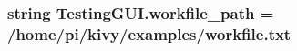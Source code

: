 \subsubsection[{\texorpdfstring{workfile\+\_\+path}{workfile_path}}]{\setlength{\rightskip}{0pt plus 5cm}string Testing\+G\+U\+I.\+workfile\+\_\+path = \textquotesingle{}/home/pi/kivy/examples/workfile.\+txt\textquotesingle{}}\hypertarget{namespaceTestingGUI_a11c4b70f772a0a449cd7b0dabf533848}{}\label{namespaceTestingGUI_a11c4b70f772a0a449cd7b0dabf533848}
